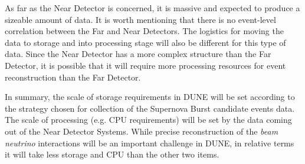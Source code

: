 As far as the Near Detector is concerned, it is massive and expected to produce a sizeable amount of data. It is worth mentioning
that there is no event-level correlation between the Far and Near Detectors. The logistics for moving the data to storage and into processing stage
will also be different for this type of data. Since the Near Detector has a more complex structure than the Far Detector, it is
possible that it will require more processing resources for event reconstruction than the Far Detector.

In summary, the scale of storage requirements in DUNE will be set according to the strategy chosen for
collection of the Supernova Burst candidate events data. The scale of processing (e.g. CPU requirements)
will be set by the data coming out of the Near Detector Systems. While precise reconstruction of the
\textit{beam neutrino} interactions will be an important challenge in DUNE, in relative terms it will take less storage
and CPU than the other two items.


